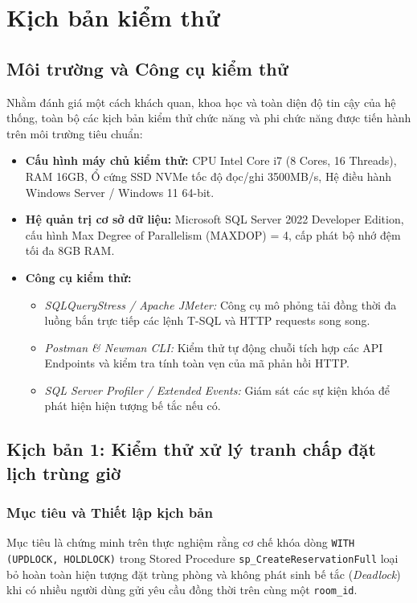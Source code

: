 \section{Kịch bản kiểm thử}

\subsection{Môi trường và Công cụ kiểm thử}
Nhằm đánh giá một cách khách quan, khoa học và toàn diện độ tin cậy của hệ thống, toàn bộ các kịch bản kiểm thử chức năng và phi chức năng được tiến hành trên môi trường tiêu chuẩn:
\begin{itemize}[leftmargin=2em]
    \item \textbf{Cấu hình máy chủ kiểm thử:} CPU Intel Core i7 (8 Cores, 16 Threads), RAM 16GB, Ổ cứng SSD NVMe tốc độ đọc/ghi 3500MB/s, Hệ điều hành Windows Server / Windows 11 64-bit.
    \item \textbf{Hệ quản trị cơ sở dữ liệu:} Microsoft SQL Server 2022 Developer Edition, cấu hình Max Degree of Parallelism (MAXDOP) = 4, cấp phát bộ nhớ đệm tối đa 8GB RAM.
    \item \textbf{Công cụ kiểm thử:} 
    \begin{itemize}
        \item \textit{SQLQueryStress / Apache JMeter:} Công cụ mô phỏng tải đồng thời đa luồng bắn trực tiếp các lệnh T-SQL và HTTP requests song song.
        \item \textit{Postman \& Newman CLI:} Kiểm thử tự động chuỗi tích hợp các API Endpoints và kiểm tra tính toàn vẹn của mã phản hồi HTTP.
        \item \textit{SQL Server Profiler / Extended Events:} Giám sát các sự kiện khóa để phát hiện hiện tượng bế tắc nếu có.
    \end{itemize}
\end{itemize}

\subsection{Kịch bản 1: Kiểm thử xử lý tranh chấp đặt lịch trùng giờ}

\subsubsection{Mục tiêu và Thiết lập kịch bản}
Mục tiêu là chứng minh trên thực nghiệm rằng cơ chế khóa dòng \texttt{WITH (UPDLOCK, HOLDLOCK)} trong Stored Procedure \texttt{sp\_CreateReservationFull} loại bỏ hoàn toàn hiện tượng đặt trùng phòng và không phát sinh bế tắc (\textit{Deadlock})~\cite{habibi2024towards} khi có nhiều người dùng gửi yêu cầu đồng thời trên cùng một \texttt{room\_id}.

